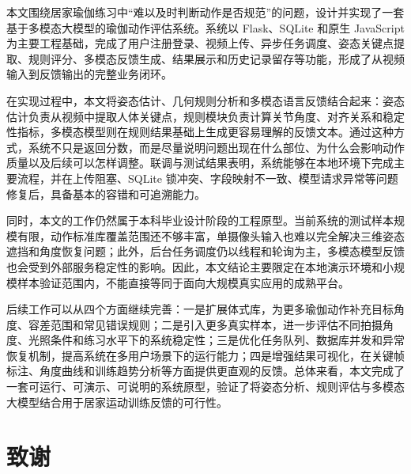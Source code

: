 \documentclass[UTF8,twoside]{ctexrep}
\makeatletter
\def@NAT@last@yr{\@citea}%
\def@NAT@last@yr{-\NAT@penalty}%
\makeatother
\begin{document}
本文围绕居家瑜伽练习中“难以及时判断动作是否规范”的问题，设计并实现了一套基于多模态大模型的瑜伽动作评估系统。系统以 Flask、SQLite 和原生 JavaScript 为主要工程基础，完成了用户注册登录、视频上传、异步任务调度、姿态关键点提取、规则评分、多模态反馈生成、结果展示和历史记录留存等功能，形成了从视频输入到反馈输出的完整业务闭环。

在实现过程中，本文将姿态估计、几何规则分析和多模态语言反馈结合起来：姿态估计负责从视频中提取人体关键点，规则模块负责计算关节角度、对齐关系和稳定性指标，多模态模型则在规则结果基础上生成更容易理解的反馈文本。通过这种方式，系统不只是返回分数，而是尽量说明问题出现在什么部位、为什么会影响动作质量以及后续可以怎样调整。联调与测试结果表明，系统能够在本地环境下完成主要流程，并在上传阻塞、SQLite 锁冲突、字段映射不一致、模型请求异常等问题修复后，具备基本的容错和可追溯能力。

同时，本文的工作仍然属于本科毕业设计阶段的工程原型。当前系统的测试样本规模有限，动作标准库覆盖范围还不够丰富，单摄像头输入也难以完全解决三维姿态遮挡和角度恢复问题；此外，后台任务调度仍以线程和轮询为主，多模态模型反馈也会受到外部服务稳定性的影响。因此，本文结论主要限定在本地演示环境和小规模样本验证范围内，不能直接等同于面向大规模真实应用的成熟平台。

后续工作可以从四个方面继续完善：一是扩展体式库，为更多瑜伽动作补充目标角度、容差范围和常见错误规则；二是引入更多真实样本，进一步评估不同拍摄角度、光照条件和练习水平下的系统稳定性；三是优化任务队列、数据库并发和异常恢复机制，提高系统在多用户场景下的运行能力；四是增强结果可视化，在关键帧标注、角度曲线和训练趋势分析等方面提供更直观的反馈。总体来看，本文完成了一套可运行、可演示、可说明的系统原型，验证了将姿态分析、规则评估与多模态大模型结合用于居家运动训练反馈的可行性。




\chapter*{致谢}
\end{document}
